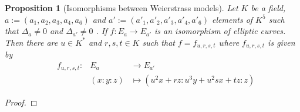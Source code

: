 \documentclass[a4paper,12pt,reqno]{amsart}
\newtheorem{proposition}[lemma]{Proposition}
\theoremstyle{definition}
\numberwithin{lemma}{section}
\numberwithin{equation}{section}
\numberwithin{figure}{section}
\begin{document}
\begin{proposition}[Isomorphisms between Weierstrass models]\label{stmt:iso-between-weierstrass-over-K-is-urst}
	Let $K$ be a field,  $a := (a_1,a_2,a_3,a_4,a_6)$  and $a' := (a'_1,a'_2,a'_3,a'_4,a'_6) $ elements of $K^5$ such that $\Delta_a \neq 0$ and $\Delta_{a'} \neq 0$ . If $f : E_a \to E_{a'}$ is an isomorphism of elliptic curves. Then there are $u \in K^*$ and $r,s,t \in K$ such that $f=f_{u,r,s,t}$ where $f_{u,r,s,t}$ is given by
\begin{align}
&f_{u,r,s,t} : &E_a &\to E_{a'} \label{eq:weierstrass-isomorphism} \\
& &(x:y:z) & \mapsto (u^2x+rz:u^3y+u^2sx+tz:z) \nonumber
\end{align}
\end{proposition}
\begin{proof}
\end{proof}

\begin{comment}
The sage code that verifies these computations.
# R1.<a1,a2,a3,a4,a6> = QQ[]
# R2.<u,r,s,t> = R1[]
R1.<u,r,s,t> = QQ[]
R2.<a6,a4,a3,a2,a1> = R1[]
R3.<x,y,z> = R2[]
f = y^2*z+ a1*x*y*z+a3*y*z^2-(x^3+a2*x^2*z+a4*x*z^2+a6*z^3)
x1 = u^2*x+r*z
y1 = u^3*y+u^2*s*x+t*z
z1 = z
f1 = f(x=x1,y=y1,z=z1)/u^6
x2 = (x-r*z)/u^2
y2 = (y-s*(x-r*z)-t*z)/u^3
z2 = z
f2 = f(x=x2,y=y2,z=z2)*u^6
ff2 = R3(f2.numerator())
assert f2 == ff2
aa1 = ff2.coefficient(x*y*z)
aa2 = -ff2.coefficient(x^2*z)
aa3 = ff2.coefficient(y*z^2)
aa4 = -ff2.coefficient(x*z^2)
aa6 = -ff2.coefficient(z^3)
assert aa1 == R3(a1*u - 2*s)
assert aa2 == R3(a2*u^2 + a1*u*s - s^2 -3*r)
aa3_red =  R3(a3*u^3 + (-2)*t)
assert aa3 == aa3_red - aa1*r
aa4_red = R3(a4*u^4 + a3*u^3*s + (-3)*r^2 + a1*u*t + (-2)*s*t)
assert aa4 == aa4_red-2*aa2*r
aa6_red =R3(a6*u^6 + a3*u^3*t - r^3 - t^2)
assert aa6 == aa6_red-aa4*r-aa2*r^2
sage: latex(aa1)
u a_{1} - 2 s
sage: latex(aa2)
u^{2} a_{2} + \left(u s\right) a_{1} - s^{2} - 3 r
sage: latex(aa3)
u^{3} a_{3} + \left(-u r\right) a_{1} + 2 r s - 2 t
sage: latex(aa3_red)
u^{3} a_{3} - 2 t
sage: latex(aa4_red)
u^{4} a_{4} + \left(u^{3} s\right) a_{3} + \left(u t\right) a_{1} - 3 r^{2} - 2 s t
sage: latex(aa6_red)
u^{6} a_{6} + \left(u^{3} t\right) a_{3} - r^{3} - t^{2}
\end{comment}
\end{document}
